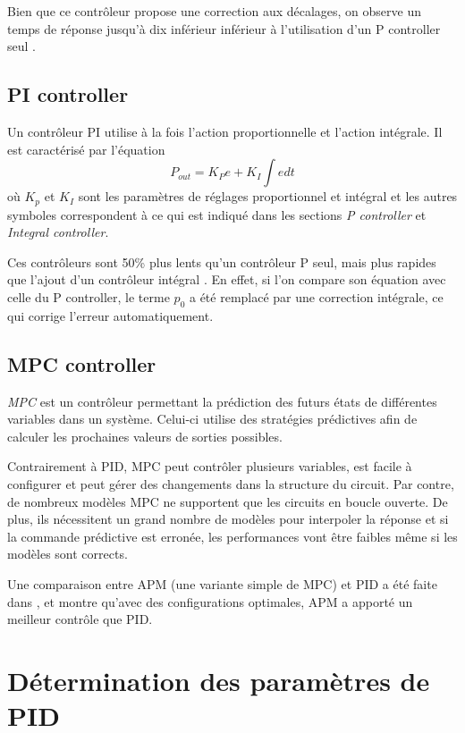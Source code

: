 \documentclass[a4paper,10pt]{report}
\begin{document}
Bien que ce contrôleur propose une correction aux décalages, on observe un temps de réponse jusqu'à dix inférieur inférieur à l'utilisation d'un P controller seul \cite{svrcek2014real}.

\subsection{PI controller}
Un contrôleur PI utilise à la fois l'action proportionnelle et l'action intégrale.
Il est caractérisé par l'équation
\begin{equation}P_{out} = K_{P} e + K_{I} \int e dt\end{equation}
où $K_{p}$ et $K_{I}$ sont les paramètres de réglages proportionnel et intégral
et les autres symboles correspondent à ce qui est indiqué dans les sections \emph{P controller} et \emph{Integral controller}.

Ces contrôleurs sont 50\% plus lents qu'un contrôleur P seul, mais plus rapides que l'ajout d'un contrôleur intégral \cite{svrcek2014real}.
En effet, si l'on compare son équation avec celle du P controller, le terme $p_0$ a été remplacé par une correction intégrale, ce qui corrige l'erreur automatiquement.

\subsection{MPC controller}
\emph{MPC} est un contrôleur permettant la prédiction des futurs états de différentes variables dans un système.
Celui-ci utilise des stratégies prédictives afin de calculer les prochaines valeurs de sorties possibles.

Contrairement à PID, MPC peut contrôler plusieurs variables, est facile à configurer et peut gérer des changements dans la structure du circuit. %
Par contre, de nombreux modèles MPC ne supportent que les circuits en boucle ouverte.
De plus, ils nécessitent un grand nombre de modèles pour interpoler la réponse et si la commande prédictive est erronée, les performances vont être faibles même si les modèles sont corrects.

Une comparaison entre APM (une variante simple de MPC) et PID a été faite dans \cite{saletovic2014apm}, et montre qu'avec des configurations optimales, APM a apporté un meilleur contrôle que PID.

\section{Détermination des paramètres de PID}
\end{document}
